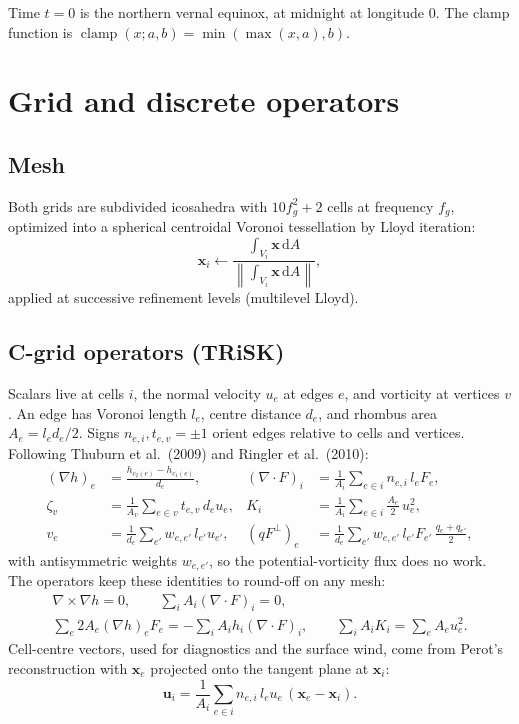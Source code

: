 \documentclass[11pt,a4paper]{article}
\newcommand{\dd}{\mathrm{d}}
\newcommand{\vect}[1]{\bm{#1}}
\newcommand{\clamp}{\operatorname{clamp}}
\begin{document}
\noindent Time $t = 0$ is the northern vernal equinox, at midnight at longitude
$0$. The clamp function is
$\clamp(x; a, b) = \min(\max(x, a), b)$.

\section{Grid and discrete operators}

\subsection{Mesh}
Both grids are subdivided icosahedra with $10 f_g^2 + 2$ cells at frequency $f_g$,
optimized into a spherical centroidal Voronoi tessellation by Lloyd iteration:
\begin{equation}
\vect{x}_i \leftarrow
  \frac{\int_{V_i} \vect{x}\,\dd A}{\left\lVert\int_{V_i} \vect{x}\,\dd A\right\rVert},
\end{equation}
applied at successive refinement levels (multilevel Lloyd).

\subsection{C-grid operators (TRiSK)}
Scalars live at cells $i$, the normal velocity $u_e$ at edges $e$, and vorticity
at vertices $v$. An edge has Voronoi length $l_e$, centre distance $d_e$, and
rhombus area $A_e = l_e d_e/2$. Signs $n_{e,i}, t_{e,v} = \pm1$ orient edges
relative to cells and vertices. Following Thuburn et al.\ (2009) and Ringler et
al.\ (2010):
\begin{align}
(\nabla h)_e &= \frac{h_{c_2(e)} - h_{c_1(e)}}{d_e}, &
(\nabla\cdot F)_i &= \frac{1}{A_i}\sum_{e\in i} n_{e,i}\, l_e F_e, \\
\zeta_v &= \frac{1}{A_v}\sum_{e\in v} t_{e,v}\, d_e u_e, &
K_i &= \frac{1}{A_i}\sum_{e\in i}\frac{A_e}{2}\,u_e^2, \\
v_e &= \frac{1}{d_e}\sum_{e'} w_{e,e'}\, l_{e'} u_{e'}, &
(qF^\perp)_e &= \frac{1}{d_e}\sum_{e'} w_{e,e'}\, l_{e'} F_{e'}\,
    \frac{q_e + q_{e'}}{2},
\end{align}
with antisymmetric weights $w_{e,e'}$, so the potential-vorticity flux does no
work. The operators keep these identities to round-off on any mesh:
\begin{gather}
\nabla\times\nabla h = 0, \qquad
\sum_i A_i (\nabla\cdot F)_i = 0, \\
\sum_e 2A_e (\nabla h)_e F_e = -\sum_i A_i h_i (\nabla\cdot F)_i, \qquad
\sum_i A_i K_i = \sum_e A_e u_e^2 .
\end{gather}
Cell-centre vectors, used for diagnostics and the surface wind, come from Perot's
reconstruction with $\vect{x}_e$ projected onto the tangent plane at $\vect{x}_i$:
\begin{equation}
\vect{u}_i = \frac{1}{A_i}\sum_{e\in i} n_{e,i}\, l_e u_e\,(\vect{x}_e - \vect{x}_i).
\end{equation}
\end{document}
